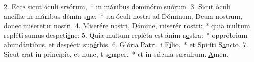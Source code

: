 2. Ecce sicut óculi srv\uline{ó}rum,~* in mánibus dominórm su\uline{ó}rum.
3. Sicut óculi ancíllæ in mánibus dómin s\uline{u}æ:~* ita óculi nostri ad Dóminum, Deum nostrum, donec miseretur n\uline{o}stri.
4. Miserére nostri, Dómine, miserér n\uline{o}stri:~* quia multum repléti sumus despcti\uline{ó}ne:
5. Quia multum repléta est ánim n\uline{o}stra:~* oppróbrium abundántibus, et despécti sup\uline{é}rbis.
6. Glória Patri, t F\uline{í}lio,~* et Spiríti S\uline{a}ncto.
7. Sicut erat in princípio, et nunc, t s\uline{e}mper,~* et in sǽcula sæculrum. \uline{A}men.
